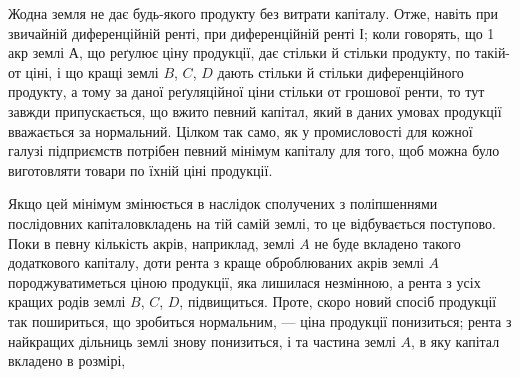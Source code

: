 Жодна земля не дає будь-якого продукту без витрати капіталу. Отже,
навіть при звичайній диференційній ренті, при диференційній ренті І; коли говорять,
що 1 акр землі $А$, що реґулює ціну продукції, дає стільки й стільки продукту,
по такій-от ціні, і що кращі землі $B$, $C$, $D$ дають стільки й стільки диференційного
продукту, а тому за даної реґуляційної ціни стільки от грошової ренти, то
тут завжди припускається, що вжито певний капітал, який в даних умовах продукції
вважається за нормальний. Цілком так само, як у промисловості для
кожної галузі підприємств потрібен певний мінімум капіталу для того, щоб
можна було виготовляти товари по їхній ціні продукції.

Якщо цей мінімум змінюється в наслідок сполучених з поліпшеннями послідовних
капіталовкладень на тій самій землі, то це відбувається поступово.
Поки в певну кількість акрів, наприклад, землі $A$ не буде вкладено такого додаткового
капіталу, доти рента з краще оброблюваних акрів землі $A$ породжуватиметься
ціною продукції, яка лишилася незмінною, а рента з усіх кращих родів землі
$B$, $C$, $D$, підвищиться. Проте, скоро новий спосіб продукції так пошириться, що
зробиться нормальним, — ціна продукції понизиться; рента з найкращих дільниць
землі знову понизиться, і та частина землі $A$, в яку капітал вкладено в розмірі,
\parbreak{}  %
